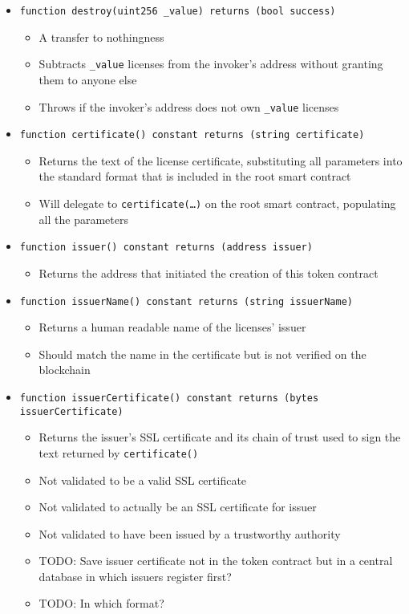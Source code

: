 \documentclass[a4paper]{article}
\newcommand{\todo}[1]{\textsf{TODO: #1}}
\begin{document}
\begin{itemize}
  \item \texttt{function destroy(uint256 \_value) returns (bool success)}
  \begin{itemize}
    \item A transfer to nothingness
    \item Subtracts \texttt{\_value} licenses from the invoker's address without granting them to anyone else
    \item Throws if the invoker's address does not own \texttt{\_value} licenses
  \end{itemize}
  
  \item \texttt{function certificate() constant returns (string certificate)}
  \begin{itemize}
    \item Returns the text of the license certificate, substituting all parameters into the standard format that is included in the root smart contract
    \item Will delegate to \texttt{certificate(…)} on the root smart contract, populating all the parameters
  \end{itemize}
  
  \item \texttt{function issuer() constant returns (address issuer)}
  \begin{itemize}
    \item Returns the address that initiated the creation of this token contract
  \end{itemize}
  
  \item \texttt{function issuerName() constant returns (string issuerName)}
  \begin{itemize}
    \item Returns a human readable name of the licenses' issuer
    \item Should match the name in the certificate but is not verified on the blockchain
  \end{itemize}
  
  \item \texttt{function issuerCertificate() constant returns (bytes issuerCertificate)}
  \begin{itemize}
    \item Returns the issuer's SSL certificate and its chain of trust used to sign the text returned by \texttt{certificate()}
    \item Not validated to be a valid SSL certificate
    \item Not validated to actually be an SSL certificate for issuer
    \item Not validated to have been issued by a trustworthy authority
    \item \todo{Save issuer certificate not in the token contract but in a central database in which issuers register first?}
    \item \todo{In which format?}
  \end{itemize}
  

\end{itemize}
\end{document}
